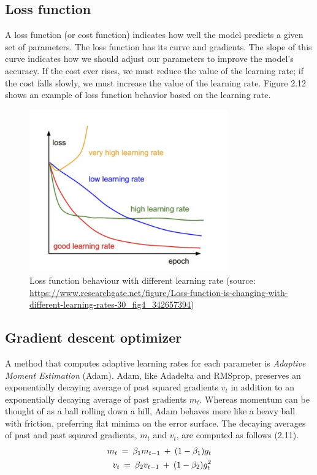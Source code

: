 \newpage
\subsection{Loss function}
\label{subsec:loss_function}
\hspace{0.5cm}A loss function (or cost function) indicates how well the model predicts a given set of parameters. The loss function has its curve and gradients. The slope of this curve indicates how we should adjust our parameters to improve the model's accuracy. If the cost ever rises, we must reduce the value of the learning rate; if the cost falls slowly, we must increase the value of the learning rate. Figure 2.12 shows an example of loss function behavior based on the learning rate.
\begin{figure}[ht]
	\centering
	\includegraphics[width=\linewidth, height=7cm,keepaspectratio]{figures/loss function DL.png}
   \caption{Loss function behaviour with different learning rate (source: \url{https://www.researchgate.net/figure/Loss-function-is-changing-with-different-learning-rates-30_fig4_342657394})}
\end{figure}

\subsection{Gradient descent optimizer}
\label{gradient_optimizer}
\hspace{0.5cm}A method that computes adaptive learning rates for each parameter is \textit{Adaptive Moment Estimation} (Adam). Adam, like Adadelta and RMSprop, preserves an exponentially decaying average of past squared gradients $v_t$ in addition to an exponentially decaying average of past gradients $m_t$. Whereas momentum can be thought of as a ball rolling down a hill, Adam behaves more like a heavy ball with friction, preferring flat minima on the error surface. The decaying averages of past and past squared gradients, $m_t$ and $v_t$, are computed as follows (2.11).
\begin{align}
    m_t \: = \: \beta_1 m_{t-1} \: + \: (1-\beta_1)g_{t}\\
    v_t \: = \: \beta_2 v_{t-1} \: + \: (1-\beta_2)g^2_t \notag
\end{align}


